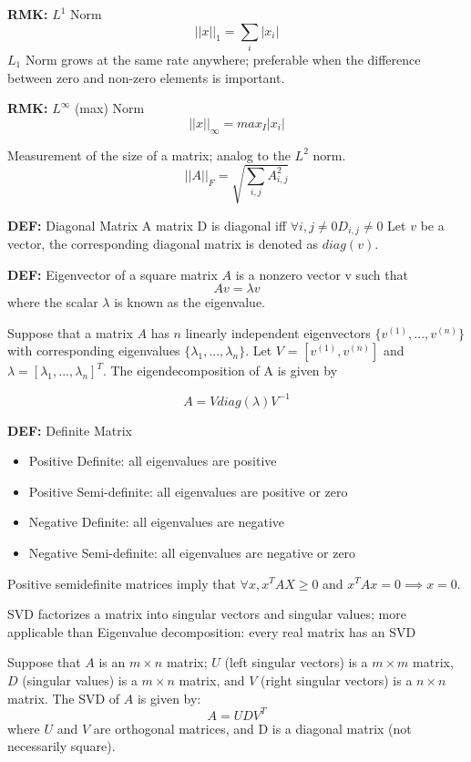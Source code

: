 \documentclass[9pt]{article}
\newcommand{\de}{\textbf{DEF: }}
\newcommand{\rmk}{\textbf{RMK: }}
\newenvironment{theorem}[2][Theorem]{\begin{trivlist}
\item[\hskip \labelsep {\bfseries #1}\hskip \labelsep {\bfseries #2}]}{\end{trivlist}}
\begin{document}
\rmk $L^1$ Norm 
$$||x||_1 = \sum_i|x_i|$$
$L_1$ Norm grows at the same rate anywhere; preferable when the difference between zero and non-zero elements is important. 

\rmk $L^\infty$ (max) Norm
$$||x||_\infty = max_I|x_i|$$

\begin{theorem}
    {Frobenius Norm}
    Measurement of the size of a matrix; analog to the $L^2$ norm.
    $$||A||_F = \sqrt{\sum_{i,j}A^2_{i,j}}$$
\end{theorem}

\de Diagonal Matrix
A matrix D is diagonal iff $\forall i,j\not=0 D_{i,j}\not=0$ Let $v$ be a vector, the corresponding diagonal matrix is denoted as $diag(v)$. \par

\de Eigenvector of a square matrix $A$ is a nonzero vector v such that
$$Av = \lambda v$$
where the scalar $\lambda$ is known as the eigenvalue. 

\begin{theorem}
    {Eigendecomposition}
    Suppose that a matrix $A$ has $n$ linearly independent eigenvectors $\{v^{(1)},...,v^{(n)}\}$ with corresponding eigenvalues $\{\lambda_1, ..., \lambda_n\}$. Let $V$ = $[v^{(1)}, v^{(n)}]$ and $\lambda = [\lambda_1,...,\lambda_n]^T$. The eigendecomposition of A is given by 
    
    $$
        A = Vdiag(\lambda)V^{-1}
    $$
\end{theorem}

\de Definite Matrix
\begin{itemize}
    \item Positive Definite: all eigenvalues are positive
    \item Positive Semi-definite: all eigenvalues are positive or zero
    \item Negative Definite: all eigenvalues are negative
    \item Negative Semi-definite: all eigenvalues are negative or zero
\end{itemize}
Positive semidefinite matrices imply that $\forall x, x^TAX\ge 0$ and $x^TAx=0\implies x=0$.

\begin{theorem}{Singular Value Decomposition}
SVD factorizes a matrix into singular vectors and singular values; more applicable than Eigenvalue decomposition: every real matrix has an SVD \par

Suppose that $A$ is an $m\times n$ matrix; $U$ (left singular vectors) is a $m\times m$ matrix, $D$ (singular values) is a $m\times n$ matrix, and $V$ (right singular vectors) is a $n\times n$ matrix. The SVD of $A$ is given by:
$$
A = UDV^T
$$
where $U$ and $V$ are orthogonal matrices, and D is a diagonal matrix (not necessarily square).
\end{theorem}

\begin{theorem}{Moore-Penrose Pseudoinverse}

\end{theorem}
\end{document}
